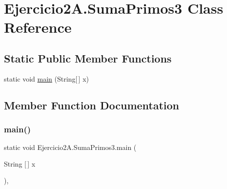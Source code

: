 \hypertarget{class_ejercicio2_a_1_1_suma_primos3}{}\section{Ejercicio2\+A.\+Suma\+Primos3 Class Reference}
\label{class_ejercicio2_a_1_1_suma_primos3}
\subsection*{Static Public Member Functions}
\begin{DoxyCompactItemize}
\item 
static void \mbox{\hyperlink{class_ejercicio2_a_1_1_suma_primos3_aadf88bb0e79fc994faddd9247ba27ae5}{main}} (String\mbox{[}$\,$\mbox{]} x)
\end{DoxyCompactItemize}


\subsection{Member Function Documentation}
\mbox{\label{class_ejercicio2_a_1_1_suma_primos3_aadf88bb0e79fc994faddd9247ba27ae5}} 
\subsubsection{\texorpdfstring{main()}{main()}}
{\footnotesize\ttfamily static void Ejercicio2\+A.\+Suma\+Primos3.\+main (\begin{DoxyParamCaption}\item[{String \mbox{[}$\,$\mbox{]}}]{x }\end{DoxyParamCaption})\hspace{0.3cm}{\ttfamily [inline]}, {\ttfamily [static]}}


